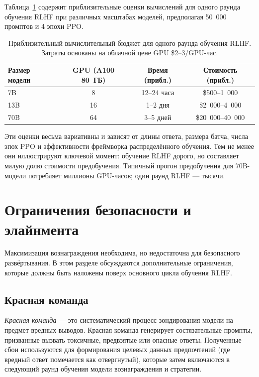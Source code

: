 Таблица~\ref{tab:compute-budget} содержит приблизительные оценки вычислений для одного раунда обучения RLHF при различных масштабах моделей, предполагая 50~000 промптов и 4 эпохи PPO.

\begin{table}[ht]
\centering
{\footnotesize
\begin{tabular}{@{}lccc@{}}
\toprule
\textbf{Размер модели} & \textbf{GPU (A100 80~ГБ)} & \textbf{Время (прибл.)} & \textbf{Стоимость (прибл.)} \\
\midrule
7B   & 8   & 12--24 часа & \$500--1~000 \\
13B  & 16  & 1--2 дня    & \$2~000--4~000 \\
70B  & 64  & 3--5 дней   & \$20~000--40~000 \\
\bottomrule
\end{tabular}
}
\caption{Приблизительный вычислительный бюджет для одного раунда обучения RLHF. Затраты основаны на облачной цене GPU \$2--3/GPU-час.}
\label{tab:compute-budget}
\end{table}

Эти оценки весьма вариативны и зависят от длины ответа, размера батча, числа эпох PPO и эффективности фреймворка распределённого обучения. Тем не менее они иллюстрируют ключевой момент: обучение RLHF дорого, но составляет малую долю стоимости предобучения. Типичный прогон предобучения для 70B-модели потребляет миллионы GPU-часов; один раунд RLHF --- тысячи.

\section{Ограничения безопасности и элайнмента}
\label{sec:safety-constraints}

Максимизация вознаграждения необходима, но недостаточна для безопасного развёртывания. В этом разделе обсуждаются дополнительные ограничения, которые должны быть наложены поверх основного цикла обучения RLHF.

\subsection{Красная команда}

\emph{Красная команда} --- это систематический процесс зондирования модели на предмет вредных выводов. Красная команда генерирует состязательные промпты, призванные вызвать токсичные, предвзятые или опасные ответы. Полученные сбои используются для формирования целевых данных предпочтений (где вредный ответ помечается как отвергнутый), которые затем включаются в следующий раунд обучения модели вознаграждения и стратегии.

